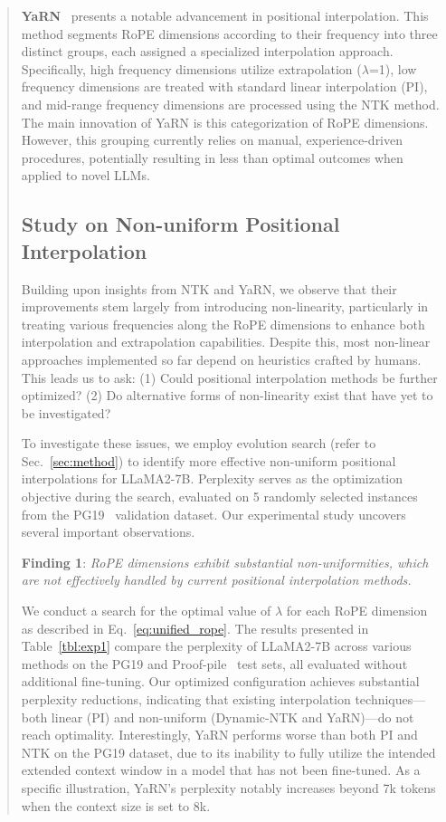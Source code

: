 \begin{abstract}
\textbf{YaRN}~\cite{yarn} presents a notable advancement in positional interpolation. This method segments RoPE dimensions according to their frequency into three distinct groups, each assigned a specialized interpolation approach. Specifically, high frequency dimensions utilize extrapolation ($\lambda$=1), low frequency dimensions are treated with standard linear interpolation (PI), and mid-range frequency dimensions are processed using the NTK method. The main innovation of YaRN is this categorization of RoPE dimensions. However, this grouping currently relies on manual, experience-driven procedures, potentially resulting in less than optimal outcomes when applied to novel LLMs.

\subsection{Study on Non-uniform Positional Interpolation}

Building upon insights from NTK and YaRN, we observe that their improvements stem largely from introducing non-linearity, particularly in treating various frequencies along the RoPE dimensions to enhance both interpolation and extrapolation capabilities. Despite this, most non-linear approaches implemented so far depend on heuristics crafted by humans. This leads us to ask: (1) Could positional interpolation methods be further optimized? (2) Do alternative forms of non-linearity exist that have yet to be investigated?

To investigate these issues, we employ evolution search (refer to Sec.~\ref{sec:method}) to identify more effective non-uniform positional interpolations for LLaMA2-7B. Perplexity serves as the optimization objective during the search, evaluated on 5 randomly selected instances from the PG19~\cite{pg19} validation dataset. Our experimental study uncovers several important observations.

\textbf{Finding 1}: \textit{RoPE dimensions exhibit substantial non-uniformities, which are not effectively handled by current positional interpolation methods.}

We conduct a search for the optimal value of $\lambda$ for each RoPE dimension as described in Eq.~\ref{eq:unified_rope}. The results presented in Table~\ref{tbl:exp1} compare the perplexity of LLaMA2-7B across various methods on the PG19 and Proof-pile~\cite{proof-pile} test sets, all evaluated without additional fine-tuning. Our optimized configuration achieves substantial perplexity reductions, indicating that existing interpolation techniques—both linear (PI) and non-uniform (Dynamic-NTK and YaRN)—do not reach optimality. Interestingly, YaRN performs worse than both PI and NTK on the PG19 dataset, due to its inability to fully utilize the intended extended context window in a model that has not been fine-tuned. As a specific illustration, YaRN’s perplexity notably increases beyond 7k tokens when the context size is set to 8k.


\end{abstract}
